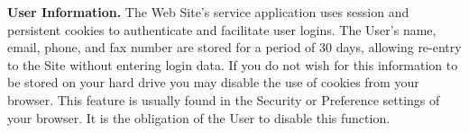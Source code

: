 \textbf{User Information.}
The Web Site's service application uses session and persistent cookies to
authenticate and facilitate user logins. The User's name, email, phone, and fax
number are stored for a period of 30 days, allowing re-entry to the Site without
entering login data. If you do not wish for this information to be stored on
your hard drive you may disable the use of cookies from your browser. This
feature is usually found in the Security or Preference settings of your browser.
It is the obligation of the User to disable this function.